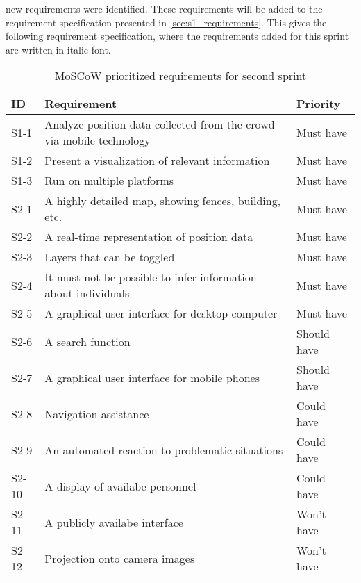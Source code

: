 new requirements were identified. These requirements will be added to the requirement specification presented in \cref{sec:s1_requirements}. This gives the following requirement specification, where the requirements added for this sprint are written in italic font.

\begin{table}[htbp]
	\centering
	\begin{tabularx}{\textwidth}{lXl}
		\toprule
		\textbf{ID} & \textbf{Requirement} & \textbf{Priority} \\
		\toprule 
		
		\rowcolor[HTML]{EFEFEF} 
		S1-1  & Analyze position data collected from the crowd via mobile technology    & Must have \\
		S1-2  & Present a visualization of relevant information                         & Must have \\
		\rowcolor[HTML]{EFEFEF} 
		S1-3  & Run on multiple platforms                                               & Must have \\  
		S2-1  & A highly detailed map, showing fences, building, etc.                   & Must have \\
		\rowcolor[HTML]{EFEFEF} 
		S2-2  & A real-time representation of position data                                & Must have \\
		S2-3  & Layers that can be toggled                                                 & Must have \\
		\rowcolor[HTML]{EFEFEF} 
		S2-4  & It must not be possible to infer information about individuals             & Must have \\ 
		S2-5  & A graphical user interface for desktop computer & Must have \\
		\rowcolor[HTML]{EFEFEF} 
		S2-6  & A search function & Should have \\
		S2-7  & A graphical user interface for mobile phones & Should have \\
		\rowcolor[HTML]{EFEFEF} 
		S2-8  & Navigation assistance & Could have \\ 
		S2-9  & An automated reaction to problematic situations & Could have \\
		\rowcolor[HTML]{EFEFEF} 
		S2-10 & A display of availabe personnel & Could have \\
		S2-11 & A publicly availabe interface & Won't have \\
		\rowcolor[HTML]{EFEFEF} 
		S2-12 & Projection onto camera images & Won't have \\       
		\bottomrule
	\end{tabularx}
	\caption{MoSCoW prioritized requirements for second sprint}
	\label{tab:s2_req}
\end{table}





